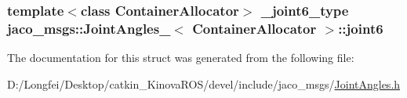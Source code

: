 \subsubsection[{\texorpdfstring{joint6}{joint6}}]{\setlength{\rightskip}{0pt plus 5cm}template$<$class Container\+Allocator$>$ {\bf \+\_\+joint6\+\_\+type} {\bf jaco\+\_\+msgs\+::\+Joint\+Angles\+\_\+}$<$ Container\+Allocator $>$\+::joint6}\hypertarget{structjaco__msgs_1_1JointAngles___a474d9f2a0e329ba6bd08c8fa265e9a50}{}\label{structjaco__msgs_1_1JointAngles___a474d9f2a0e329ba6bd08c8fa265e9a50}


The documentation for this struct was generated from the following file\+:\begin{DoxyCompactItemize}
\item 
D\+:/\+Longfei/\+Desktop/catkin\+\_\+\+Kinova\+R\+O\+S/devel/include/jaco\+\_\+msgs/\hyperlink{JointAngles_8h}{Joint\+Angles.\+h}\end{DoxyCompactItemize}
